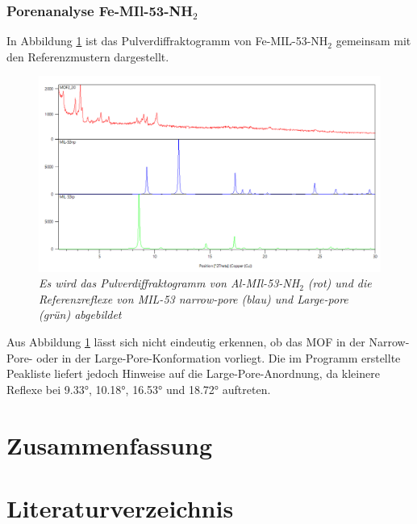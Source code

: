 \documentclass[12pt, a4paper]{article}
\begin{document}
\newpage

\subsubsection{\texorpdfstring{Porenanalyse Fe-MIl-53-NH$_2$}{Porenanalyse Fe-MIl-53-NH2}}
In Abbildung \ref{MOF220ver} ist das Pulverdiffraktogramm von Fe-MIL-53-NH$_2$ gemeinsam mit den Referenzmustern dargestellt. 

\begin{figure}[!h]
    \centering
    \includegraphics[scale=0.5]{MOF220ver.png}
    \caption{\textit{Es wird das Pulverdiffraktogramm von Al-MIl-53-NH$_2$ (rot) und die Referenzreflexe von MIL-53 narrow-pore (blau) und Large-pore (grün) abgebildet}}
    \label{MOF220ver}
\end{figure}
\noindent
Aus Abbildung \ref{MOF220ver} lässt sich nicht eindeutig erkennen, ob das MOF in der Narrow-Pore- oder in der Large-Pore-Konformation vorliegt. Die im Programm erstellte 
Peakliste liefert jedoch Hinweise auf die Large-Pore-Anordnung, da kleinere Reflexe bei 9.33°, 10.18°, 16.53° und 18.72° auftreten.


\newpage
\section{Zusammenfassung}



\newpage
\section{Literaturverzeichnis}
\printbibliography
\end{document}
